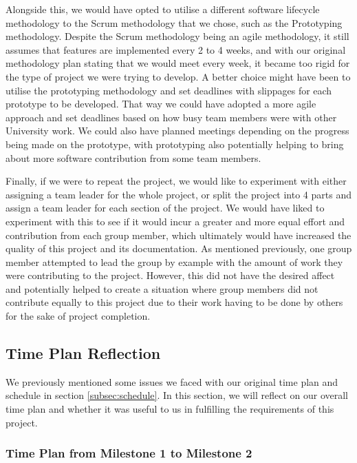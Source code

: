             Alongside this, we would have opted to utilise a different software lifecycle methodology to the Scrum methodology that we chose, such as the Prototyping methodology. Despite the Scrum methodology being an agile methodology, it still assumes that features are implemented every 2 to 4 weeks, and with our original methodology plan stating that we would meet every week, it became too rigid for the type of project we were trying to develop. A better choice might have been to utilise the prototyping methodology and set deadlines with slippages for each prototype to be developed. That way we could have adopted a more agile approach and set deadlines based on how busy team members were with other University work. We could also have planned meetings depending on the progress being made on the prototype, with prototyping also potentially helping to bring about more software contribution from some team members.

            Finally, if we were to repeat the project, we would like to experiment with either assigning a team leader for the whole project, or split the project into 4 parts and assign a team leader for each section of the project. We would have liked to experiment with this to see if it would incur a greater and more equal effort and contribution from each group member, which ultimately would have increased the quality of this project and its documentation. As mentioned previously, one group member attempted to lead the group by example with the amount of work they were contributing to the project. However, this did not have the desired affect and potentially helped to create a situation where group members did not contribute equally to this project due to their work having to be done by others for the sake of project completion.

        \subsection{Time Plan Reflection}

            We previously mentioned some issues we faced with our original time plan and schedule in section \ref{subsec:schedule}. In this section, we will reflect on our overall time plan and whether it was useful to us in fulfilling the requirements of this project. 

            \subsubsection{Time Plan from Milestone 1 to Milestone 2}

